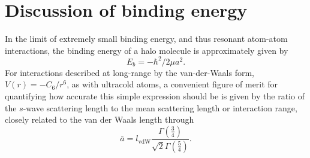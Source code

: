 
\section{Discussion of binding energy}
\label{sec:lowE_alt}



In the limit of extremely small binding energy, and thus resonant atom-atom interactions, the binding energy of a halo molecule is approximately given by \cite{kgj06}
\begin{equation}\label{Eq:HaloEnergyNoCorrections}
	E_b=-\hbar^2/2\mu a^2.
\end{equation}
For interactions described at long-range by the van-der-Waals form, $V(r)=-C_6/r^6$, as with ultracold atoms, a convenient figure of merit for quantifying how accurate this simple expression should be is given by the ratio of the $s$-wave scattering length to the mean scattering length or interaction range, closely related to the van der Waals length through \cite{gfl93,cju05}
\begin{equation}\label{Eq:InteractionRangevdW}
  \bar{a}= l_{\mathrm{vdW}}\frac{\Gamma\left(\frac{3}{4}\right)}{\sqrt{2}\Gamma\left(\frac{5}{4}\right)}.
\end{equation}


